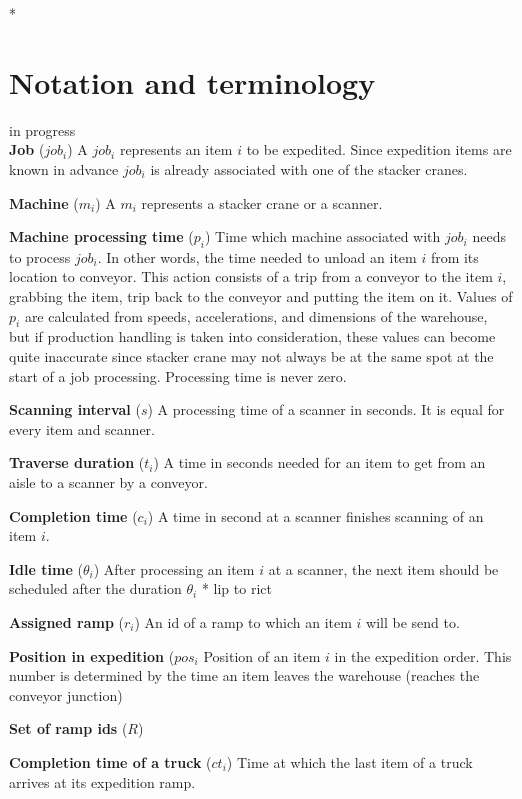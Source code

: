 \documentclass{ctuthesis}
\begin{document}
*

\section{Notation and terminology}
in progress\\
\noindent \textbf{Job} ($job_i$) A $job_i$ represents an item $i$ to be expedited. Since expedition items are known in advance $job_i$ is already associated with one of the stacker cranes. 

\noindent \textbf{Machine} ($m_i$) A $m_i$ represents a stacker crane or a scanner. 

\noindent \textbf{Machine processing time} ($p_i$) Time which machine associated with $job_i$ needs to process $job_i$. In other words, the time needed to unload an item $i$ from its location to conveyor. This action consists of a trip from a conveyor to the item $i$, grabbing the item, trip back to the conveyor and putting the item on it. Values of $p_i$ are calculated from speeds, accelerations, and dimensions of the warehouse, but if production handling is taken into consideration, these values can become quite inaccurate since stacker crane may not always be at the same spot at the start of a job processing. Processing time is never zero.


\noindent \textbf{Scanning interval} ($s$) A processing time of a scanner in seconds. It is equal for every item and scanner.

\noindent \textbf{Traverse duration} ($t_i$) A time in seconds needed for an item to get from an aisle to a scanner by a conveyor.

\noindent \textbf{Completion time} ($c_i$) A time in second at a scanner finishes scanning of an item $i$.

\noindent \textbf{Idle time} ($\theta_i$) After processing an item $i$ at a scanner, the next item should be scheduled after the duration $\theta_i$ * lip to rict

\noindent \textbf{Assigned ramp} ($r_i$) An id of a ramp to which an item $i$ will be send to.

\noindent \textbf{Position in expedition} ($pos_i$ Position of an item $i$ in the expedition order. This number is determined by the time an item leaves the warehouse (reaches the conveyor junction)

\noindent \textbf{Set of ramp ids} ($R$) 

\noindent \textbf{Completion time of a truck} ($ct_i$) Time at which the last item of a truck arrives at its expedition ramp.
\end{document}
